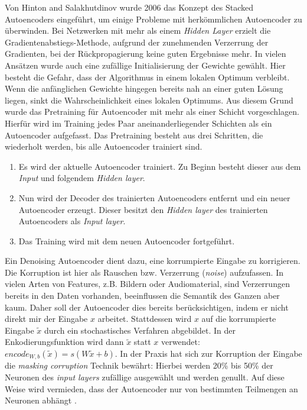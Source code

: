Von Hinton and Salakhutdinov \cite{dae2006} wurde 2006 das Konzept des Stacked Autoencoders eingeführt, um einige Probleme mit herkömmlichen Autoencoder zu überwinden. Bei Netzwerken mit mehr als einem \textit{Hidden Layer} erzielt die Gradientenabstiegs-Methode, aufgrund der zunehmenden Verzerrung der Gradienten, bei der Rückpropagierung keine guten Ergebnisse mehr. In vielen Ansätzen wurde auch eine zufällige Initialisierung der Gewichte gewählt. Hier besteht die Gefahr, dass der Algorithmus in einem lokalen Optimum verbleibt. Wenn die anfänglichen Gewichte hingegen bereits nah an einer guten Lösung liegen, sinkt die Wahrscheinlichkeit eines lokalen Optimums. Aus diesem Grund wurde das Pretraining für Autoencoder mit mehr als einer Schicht vorgeschlagen. Hierfür wird im Training jedes Paar aneinanderliegender Schichten als ein Autoencoder aufgefasst. Das Pretraining besteht aus drei Schritten, die wiederholt werden, bis alle Autoencoder trainiert sind.

\begin{enumerate}
	\item Es wird der aktuelle Autoencoder trainiert. Zu Beginn besteht dieser aus dem \textit{Input} und folgendem \textit{Hidden layer}.
	\item Nun wird der Decoder des trainierten Autoencoders entfernt und ein neuer Autoencoder erzeugt. Dieser besitzt den \textit{Hidden layer} des trainierten Autoencoders als \textit{Input layer}.
	\item Das Training wird mit dem neuen Autoencoder fortgeführt.
\end{enumerate}

Ein Denoising Autoencoder \cite{sda2010} dient dazu, eine korrumpierte Eingabe zu korrigieren. Die Korruption ist hier als Rauschen bzw. Verzerrung (\textit{noise}) aufzufassen. In vielen Arten von Features, z.B. Bildern oder Audiomaterial, sind Verzerrungen bereits in den Daten vorhanden, beeinflussen die Semantik des Ganzen aber kaum. Daher soll der Autoencoder dies bereits berücksichtigen, indem er nicht direkt mir der Eingabe $x$ arbeitet. Stattdessen wird $x$ auf die korrumpierte Eingabe $\widetilde{x}$ durch ein stochastisches Verfahren abgebildet. In der Enkodierungsfunktion wird dann $\widetilde{x}$ statt $x$ verwendet: $encode_{W,b}(\widetilde{x}) = s(W\widetilde{x} + b)$.\newline
In der Praxis hat sich zur Korruption der Eingabe die \textit{masking corruption} Technik bewährt: Hierbei werden 20\% bis 50\% der Neuronen des \textit{input layers} zufällige ausgewählt und werden \glqq genullt\grqq. Auf diese Weise wird vermieden, dass der Autoencoder nur von bestimmten Teilmengen an Neuronen abhängt  \cite{pda2012}. 

